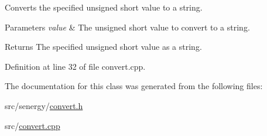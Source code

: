 Converts the specified unsigned short value to a string. 


\begin{DoxyParams}{Parameters}
{\em value} & The unsigned short value to convert to a string.\\
\hline
\end{DoxyParams}
\begin{DoxyReturn}{Returns}
The specified unsigned short value as a string. 
\end{DoxyReturn}


Definition at line 32 of file convert.\-cpp.



The documentation for this class was generated from the following files\-:\begin{DoxyCompactItemize}
\item 
src/senergy/\hyperlink{convert_8h}{convert.\-h}\item 
src/\hyperlink{convert_8cpp}{convert.\-cpp}\end{DoxyCompactItemize}
